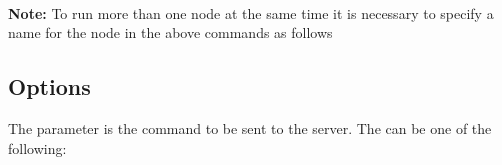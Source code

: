 \documentclass[a4paper,english]{article}
\begin{document}
     

     \\

\textbf{Note:} To run more than one  node at the same time it is necessary to specify a name for the node in the above commands as follows 


\subsection{Options}

The  parameter is the command to be sent to the server. The  can be one of the following:
\end{document}
